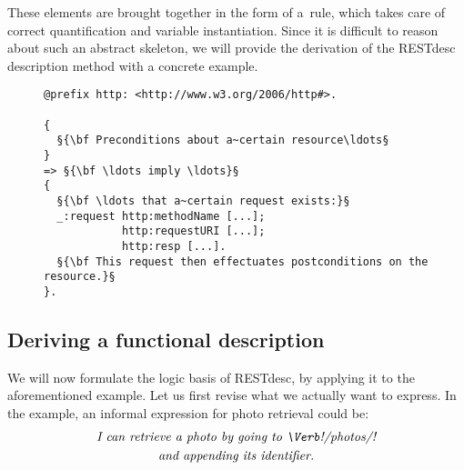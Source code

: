 \documentclass[smallextended]{svjour3}
\begin{document}
{These elements are brought together in the form of a~rule, which takes care of correct quantification and variable instantiation.
Since it is difficult to reason about such an abstract skeleton, we will provide the derivation of the RESTdesc description method with a concrete example.

\begin{figure}
\begin{lstlisting}[caption=The RESTdesc description skeleton, label=lst:Skeleton, aboveskip=0em, belowskip=0em, escapechar=§]
@prefix http: <http://www.w3.org/2006/http#>.

{
  §{\bf Preconditions about a~certain resource\ldots§
}
=> §{\bf \ldots imply \ldots}§
{
  §{\bf \ldots that a~certain request exists:}§
  _:request http:methodName [...];
            http:requestURI [...];
            http:resp [...].
  §{\bf This request then effectuates postconditions on the resource.}§
}.
\end{lstlisting}
\end{figure}

\subsection{Deriving a functional description}
\label{subsec:FunctionDescription}
We will now formulate the logic basis of RESTdesc, by applying it to the aforementioned example.
Let us first revise what we actually want to express. In the example, an informal expression for photo retrieval could be:
\begin{multline}\label{eq:Informal}
    \textit{I can retrieve a photo by going to \Verb!/photos/!}\\
    \textit{and appending its identifier.}
\end{multline}

}
\end{document}
